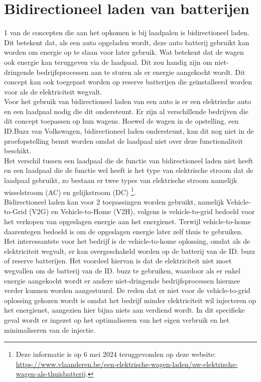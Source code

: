 \section{Bidirectioneel laden van batterijen}
\label{sec:stand-van-zaken-bidirectioneel-laden}

1 van de concepten die aan het opkomen is bij laadpalen is bidirectioneel laden. Dit betekent dat, als een auto opgeladen wordt, deze auto batterij gebruikt kan worden om energie op te slaan voor later gebruik. Wat betekent dat de wagen ook energie kan teruggeven via de laadpaal. Dit zou handig zijn om niet-dringende bedrijfsprocessen aan te sturen als er energie aangekocht wordt. Dit concept kan ook toegepast worden op reserve batterijen die geïnstalleerd worden voor als de elektriciteit wegvalt.\\

Voor het gebruik van bidirectioneel laden van een auto is er een elektrische auto en een laadpaal nodig die dit ondersteunt. Er zijn al verschillende bedrijven die dit concept toepassen op hun wagens. Hoewel de wagen in de opstelling, een ID.Buzz van Volkswagen, bidirectioneel laden ondersteunt, kan dit nog niet in de proefopstelling benut worden omdat de laadpaal niet over deze functionaliteit beschikt.\\

Het verschil tussen een laadpaal die de functie van bidirectioneel laden niet heeft en een laadpaal die de functie wel heeft is het type van elektrische stroom dat de laadpaal gebruikt, zo bestaan er twee types van elektrische stroom namelijk wisselstroom (AC) en gelijkstroom (DC) \footnote{Deze informatie is op 6 mei 2024 teruggevonden op deze website: \url{https://www.vlaanderen.be/een-elektrische-wagen-laden/uw-elektrische-wagen-als-thuisbatterij}.}.\\

Bidirectioneel laden kan voor 2 toepassingen worden gebruikt, namelijk Vehicle-to-Grid (V2G) en Vehicle-to-Home (V2H), volgens \textcite{LAZZERONI2019} is vehicle-to-grid bedoeld voor het verkopen van opgeslagen energie aan het energienet. Terwijl vehicle-to-home daarentegen bedoeld is om de opgeslagen energie later zelf thuis te gebruiken.\\

Het interessantste voor het bedrijf is de vehicle-to-home oplossing, omdat als de elektriciteit wegvalt, er kan overgeschakeld worden op de batterij van de ID. buzz of reserve batterijen. Het voordeel hiervan is dat de elektriciteit niet moet wegvallen om de batterij van de ID. buzz te gebruiken, waardoor als er enkel energie aangekocht wordt er andere niet-dringende bedrijfsprocessen hiermee verder kunnen worden aangestuurd. De reden dat er niet voor de vehicle-to-grid oplossing gekozen wordt is omdat het bedrijf minder elektriciteit wil injecteren op het energienet, aangezien hier bijna niets aan verdiend wordt. In dit specifieke geval wordt er ingezet op het optimaliseren van het eigen verbruik en het minimaliseren van de injectie.

